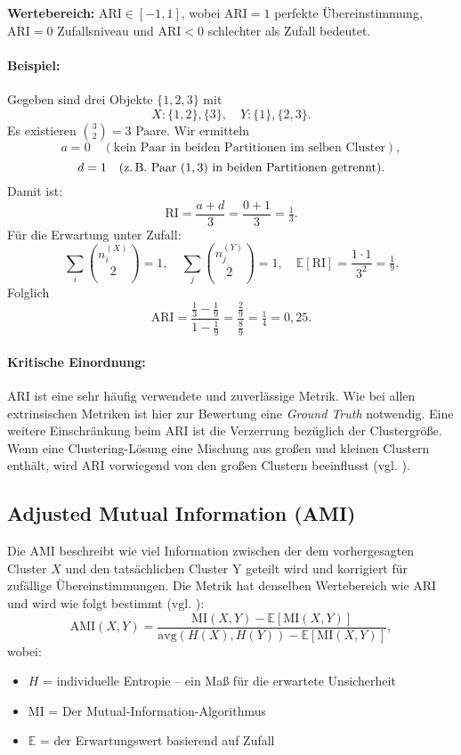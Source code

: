 \textbf{Wertebereich:} \(\mathrm{ARI}\in[-1,1]\), wobei  
\(\mathrm{ARI}=1\) perfekte Übereinstimmung,  
\(\mathrm{ARI}=0\) Zufallsniveau und  
\(\mathrm{ARI}<0\) schlechter als Zufall bedeutet.

\paragraph{Beispiel:}

Gegeben sind drei Objekte \(\{1,2,3\}\) mit  
\[
X:\{1,2\},\{3\}, 
\quad
Y:\{1\},\{2,3\}.
\]
Es existieren \(\binom{3}{2}=3\) Paare. Wir ermitteln
\[
a=0\quad(\text{kein Paar in beiden Partitionen im selben Cluster}),
\]
\[
d=1\quad(\text{z.\,B. Paar }(1,3)\text{ in beiden Partitionen getrennt}).
\]
Damit ist:
\[
\mathrm{RI}=\frac{a+d}{3}=\frac{0+1}{3}=\tfrac{1}{3}.
\]
Für die Erwartung unter Zufall:
\[
\sum_i\binom{n_i^{(X)}}{2}=1,\quad
\sum_j\binom{n_j^{(Y)}}{2}=1,
\quad
\mathbb{E}[\mathrm{RI}]=\frac{1\cdot1}{3^2}=\tfrac{1}{9}.
\]
Folglich
\[
\mathrm{ARI}
=\frac{\tfrac13-\tfrac19}{1-\tfrac19}
=\frac{\tfrac{2}{9}}{\tfrac{8}{9}}
=\tfrac{1}{4}
=0{,}25.
\]

\paragraph{Kritische Einordnung:}  
\ac{ARI} ist eine sehr häufig verwendete und zuverlässige Metrik. Wie bei allen extrinsischen Metriken ist hier zur Bewertung eine \textit{Ground Truth}
notwendig. Eine weitere Einschränkung beim \ac{ARI} ist die Verzerrung bezüglich der Clustergröße. 
Wenn eine Clustering-Lösung eine Mischung aus großen und kleinen Clustern enthält, wird \ac{ARI} vorwiegend von den großen Clustern beeinflusst (vgl. \cite{Miller2024}).

\subsection{Adjusted Mutual Information (AMI)}
Die \ac{AMI} beschreibt wie viel Information zwischen der dem vorhergesagten
Cluster \(X\) und den tatsächlichen Cluster Y geteilt wird und korrigiert für
zufällige Übereinstimmungen. 
Die Metrik hat denselben Wertebereich wie \ac{ARI} und wird wie folgt bestimmt (vgl. \cite{Miller2024}):
\[
\mathrm{AMI}(X,Y) = \frac{\mathrm{MI}(X,Y) - \mathbb{E}[\mathrm{MI}(X,Y)]}{\mathrm{avg}(H(X),H(Y)) - \mathbb{E}[\mathrm{MI}(X,Y)]},
\]
wobei:
\begin{itemize}
    \item $H$ = individuelle Entropie -- ein Maß für die erwartete Unsicherheit
    \item $\mathrm{MI}$ = Der Mutual-Information-Algorithmus 
    \item $\mathbb{E}$ = der Erwartungswert basierend auf Zufall
\end{itemize}

